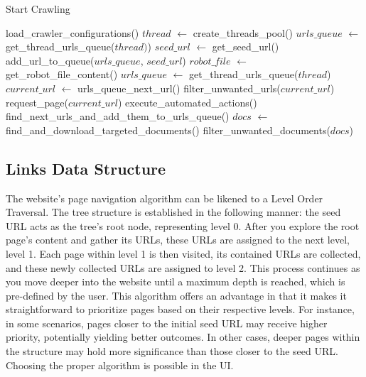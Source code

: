 \begin{algorithm}[h]
	\caption{Start Crawling}\label{alg:alg1}
	\begin{algorithmic}[1]
		\State load\_crawler\_configurations()
		\State $thread$ $\gets$ create\_threads\_pool()
	    \State $urls\_queue$ $\gets$ get\_thread\_urls\_queue($thread)$)
	    \State $seed\_url$ $\gets$ get\_seed\_url()
	    \State add\_url\_to\_queue($urls\_queue$, $seed\_url$)
	    \State $robot\_file$ $\gets$ get\_robot\_file\_content()
		    \State $urls\_queue$ $\gets$ get\_thread\_urls\_queue($thread$)
		\Else
			\State $current\_url$ $\gets$ urls\_queue\_next\_url()
			\State filter\_unwanted\_urls($current\_url$)
			\State request\_page($current\_url$)
            \State execute\_automated\_actions()
			\State find\_next\_urls\_and\_add\_them\_to\_urls\_queue()
			\State $docs$ $\gets$ find\_and\_download\_targeted\_documents()
			\State filter\_unwanted\_documents($docs$)
		\EndIf
		\EndWhile

	\end{algorithmic}
\end{algorithm}

\subsection{Links Data Structure}
The website's page navigation algorithm can be likened to a Level Order Traversal. The tree structure is established in the following manner: the seed URL acts as the tree's root node, representing level 0. After you explore the root page's content and gather its URLs, these URLs are assigned to the next level, level 1. Each page within level 1 is then visited, its contained URLs are collected, and these newly collected URLs are assigned to level 2. This process continues as you move deeper into the website until a maximum depth is reached, which is pre-defined by the user.
This algorithm offers an advantage in that it makes it straightforward to prioritize pages based on their respective levels. For instance, in some scenarios, pages closer to the initial seed URL may receive higher priority, potentially yielding better outcomes. In other cases, deeper pages within the structure may hold more significance than those closer to the seed URL. Choosing the proper algorithm is possible in the UI.

